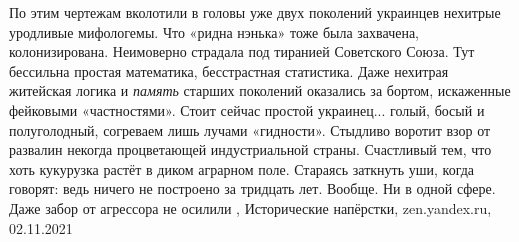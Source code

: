 По этим чертежам вколотили в головы уже двух поколений украинцев нехитрые
уродливые мифологемы. Что «ридна нэнька» тоже была захвачена, колонизирована.
Неимоверно страдала под тиранией Советского Союза. Тут бессильна простая
математика, бесстрастная статистика. Даже нехитрая житейская логика и
\emph{память} старших поколений оказались за бортом, искаженные фейковыми
«частностями».  Стоит сейчас простой украинец... голый, босый и полуголодный,
согреваем лишь лучами «гидности». Стыдливо воротит взор от развалин некогда
процветающей индустриальной страны. Счастливый тем, что хоть кукурузка растёт в
диком аграрном поле. Стараясь заткнуть уши, когда говорят: ведь ничего не
построено за тридцать лет. Вообще. Ни в одной сфере. Даже забор от агрессора не
осилили
, 
Исторические напёрстки, zen.yandex.ru, 02.11.2021
